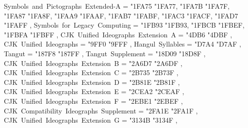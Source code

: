 {    Symbols~and~Pictographs~Extended-A             = { {"1FA75} {"1FA77}, {"1FA7B} {"1FA7F}, {"1FA87} {"1FA8F}, {"1FAA9} {"1FAAF}, {"1FAB7} {"1FABF}, {"1FAC3} {"1FACF}, {"1FAD7} {"1FAFF} },
    Symbols~for~Legacy~Computing                   = { {"1FB93} {"1FB93}, {"1FBCB} {"1FBEF}, {"1FBFA} {"1FBFF} },
    CJK~Unified~Ideographs~Extension~A             = { {"4DB6} {"4DBF} },
    CJK~Unified~Ideographs                         = { {"9FF0} {"9FFF} },
    Hangul~Syllables                               = { {"D7A4} {"D7AF} },
    Tangut                                         = { {"187F8} {"187FF} },
    Tangut~Supplement                              = { {"18D09} {"18D8F} },
    CJK~Unified~Ideographs~Extension~B             = { {"2A6D7} {"2A6DF} },
    CJK~Unified~Ideographs~Extension~C             = { {"2B735} {"2B73F} },
    CJK~Unified~Ideographs~Extension~D             = { {"2B81E} {"2B81F} },
    CJK~Unified~Ideographs~Extension~E             = { {"2CEA2} {"2CEAF} },
    CJK~Unified~Ideographs~Extension~F             = { {"2EBE1} {"2EBEF} },
    CJK~Compatibility~Ideographs~Supplement        = { {"2FA1E} {"2FA1F} },
    CJK~Unified~Ideographs~Extension~G             = { {"3134B} {"3134F} },
  }
